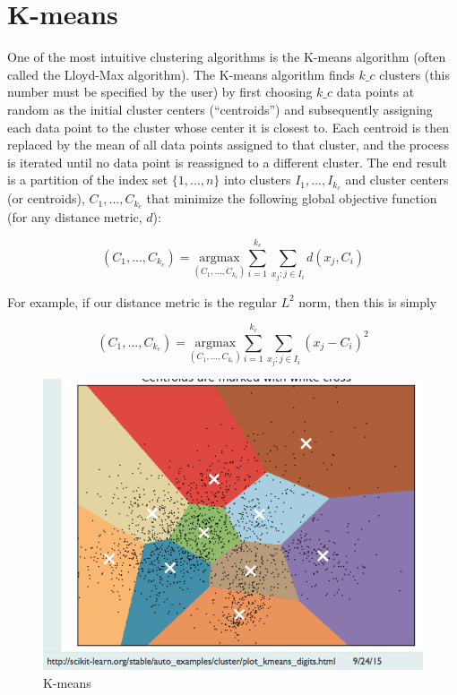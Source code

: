\section{K-means}


One of the most intuitive clustering algorithms is the K-means algorithm (often called the Lloyd-Max algorithm). The K-means algorithm finds $k\_c$ clusters (this number must be specified by the user) by first choosing $k\_c$ data points at random as the initial cluster centers (``centroids'') and subsequently assigning each data point to the cluster whose center it is closest to. Each centroid is then replaced by the mean of all data points assigned to that cluster, and the process is iterated until no data point is reassigned to a different cluster. The end result is a partition of the index set $\{1, ..., n\}$ into clusters $I_1, ..., I_{k_c}$ and cluster centers (or centroids), $C_1, ..., C_{k_c}$ that minimize the following global objective function (for any distance metric, $d$):

$$(C_1, ..., C_{k_c}) = \underset{(C_1, ..., C_{k_c})}{\text{argmax}} \sum_{i=1}^{k_c} \sum_{x_j : j \in I_i} d(x_j, C_i)$$

For example, if our distance metric is the regular $L^2$ norm, then this is simply

$$(C_1, ..., C_{k_c}) = \underset{(C_1, ..., C_{k_c})}{\text{argmax}} \sum_{i=1}^{k_c} \sum_{x_j : j \in I_i} (x_j - C_i)^2$$


\begin{figure}[H]
\begin{center}
\includegraphics[scale=0.4]{kmeans.png}
\end{center}
\caption{K-means}
\label{fig:kmeans}
\end{figure}


